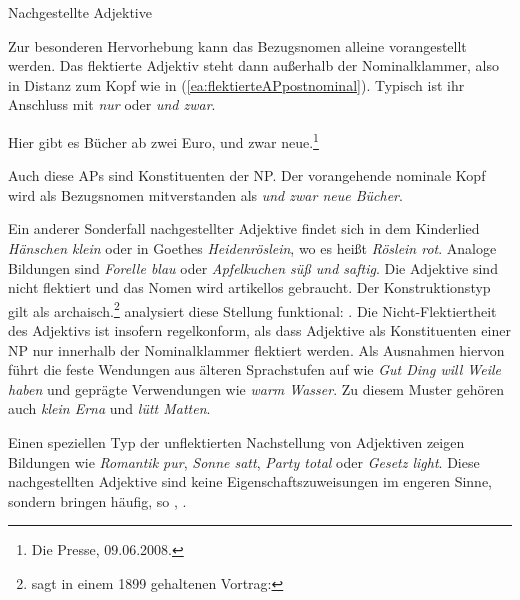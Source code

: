 \begin{Exkurs}{Nachgestellte Adjektive}
    
Zur besonderen Hervorhebung kann das Bezugsnomen alleine vorangestellt werden. Das flektierte Adjektiv steht dann außerhalb der Nominalklammer, also in Distanz zum Kopf wie in (\ref{ea:flektierteAPpostnominal}). Typisch ist ihr Anschluss mit \textit{nur} oder \textit{und zwar}.   

\ea \label{ea:flektierteAPpostnominal} Hier gibt es Bücher ab zwei Euro, und zwar neue.\footnote{Die Presse, 09.06.2008.}
\z 

Auch diese APs sind Konstituenten der NP. Der vorangehende nominale Kopf wird als Bezugsnomen mitverstanden als \textit{und zwar neue Bücher}. 

Ein anderer Sonderfall nachgestellter Adjektive findet sich in dem Kinderlied \textit{Hänschen klein} oder in Goethes \textit{Heidenröslein}, wo es heißt \textit{Röslein rot}. Analoge Bildungen sind \textit{Forelle blau} oder \textit{Apfelkuchen süß und saftig}. Die Adjektive sind nicht flektiert und das Nomen wird artikellos gebraucht. Der Konstruktionstyp gilt als archaisch.\footnote{\citet[29]{Behaghel1927} sagt in einem 1899 gehaltenen Vortrag: } \citet[63]{Duerscheid2002} analysiert diese Stellung funktional: . Die Nicht-Flektiertheit des Adjektivs ist insofern regelkonform, als dass Adjektive als Konstituenten einer NP nur innerhalb der Nominalklammer flektiert werden. Als Ausnahmen hiervon führt die \citet[455, §750]{Duden2022} feste Wendungen aus älteren Sprachstufen auf wie \textit{Gut Ding will Weile haben} und geprägte Verwendungen wie \textit{warm Wasser}. Zu diesem Muster gehören auch \textit{klein Erna} und \textit{lütt Matten}. 

Einen speziellen Typ der unflektierten Nachstellung von Adjektiven zeigen Bildungen wie \textit{Romantik pur}, \textit{Sonne satt}, \textit{Party total} oder \textit{Gesetz light}. Diese nachgestellten Adjektive sind keine Eigenschaftszuweisungen im engeren Sinne, sondern bringen häufig, so \citet[67]{Duerscheid2002}, . 


\end{Exkurs}

